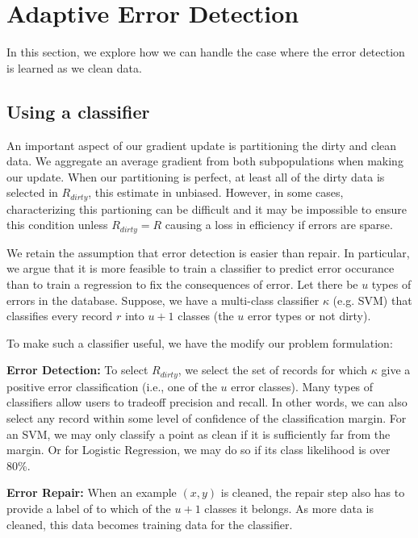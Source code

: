 \section{Adaptive Error Detection}\label{imperfect} 
In this section, we explore how we can handle the case where the error detection is learned as we clean data.

\subsection{Using a classifier}
An important aspect of our gradient update is partitioning the dirty and clean data.
We aggregate an average gradient from both subpopulations when making our update.
When our partitioning is perfect, at least all of the dirty data is selected in $R_{dirty}$, this estimate in unbiased.
However, in some cases, characterizing this partioning can be difficult and it may be impossible to ensure this condition unless $R_{dirty} = R$ causing a loss in efficiency if errors are sparse. 

We retain the assumption that error detection is easier than repair.
In particular, we argue that it is more feasible to train a classifier to predict error occurance than to train a regression to fix the consequences of error.
Let there be $u$ types of errors in the database.
Suppose, we have a multi-class classifier $\kappa$ (e.g. SVM) that classifies every record $r$ into
$u+1$ classes (the $u$ error types or not dirty).

To make such a classifier useful, we have the modify our problem formulation:

\vspace{0.5em}

\noindent\textbf{Error Detection: } To select $R_{dirty}$, we select the set of records for which $\kappa$ give a positive error classification (i.e., one of the $u$ error classes).
Many types of classifiers allow users to tradeoff precision and recall.
In other words, we can also select any record within some level of confidence of the classification margin.
For an SVM, we may only classify a point as clean if it is sufficiently far from the margin.
Or for Logistic Regression, we may do so if its class likelihood is over 80\%.

\vspace{0.5em}

\noindent\textbf{Error Repair: } When an example $(x,y)$ is cleaned, the repair step also has to provide a label of to which of the $u+1$ classes it belongs. As more data is cleaned, this data becomes training data for the classifier.

